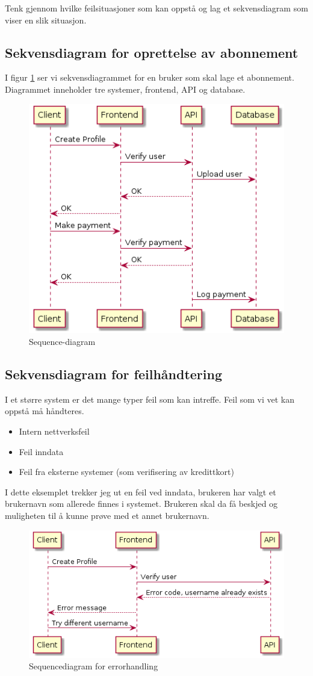 \documentclass{article}
\begin{document}
Tenk gjennom hvilke feilsituasjoner som kan oppstå og lag et sekvensdiagram som viser en slik situasjon.

\subsection{Sekvensdiagram for oprettelse av abonnement}
I figur \ref{fig:oppgave3} ser vi sekvensdiagrammet for en bruker som skal lage et abonnement. Diagrammet inneholder tre systemer, frontend, API og database.
\begin{figure}[h]
\centering
\includegraphics[scale=0.5]{images/oppgave3.png}
\caption{Sequence-diagram}
\label{fig:oppgave3}
\end{figure}

\subsection{Sekvensdiagram for feilhåndtering}
I et større system er det mange typer feil som kan intreffe. Feil som vi vet kan oppstå må håndteres.
\begin{itemize}
\item Intern nettverksfeil
\item Feil inndata
\item Feil fra eksterne systemer (som verifisering av kredittkort)
\end{itemize}

I dette eksemplet trekker jeg ut en feil ved inndata, brukeren har valgt et brukernavn som allerede finnes i systemet. Brukeren skal da få beskjed og muligheten til å kunne prøve med et annet brukernavn.

\begin{figure}[h]
\centering
\includegraphics[scale=0.5]{images/oppgave3-2.png}
\caption{Sequencediagram for errorhandling}
\label{fig:oppgave3-2}
\end{figure}
\end{document}
